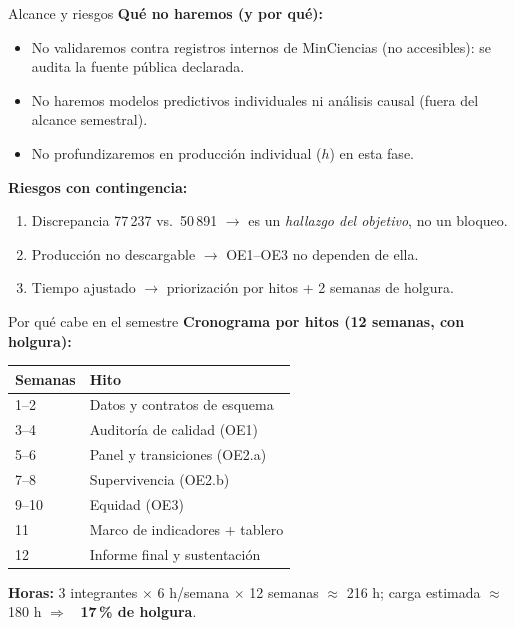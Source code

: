 \documentclass[10pt,aspectratio=169]{beamer}
\begin{document}
\begin{frame}{Alcance y riesgos}
\textbf{Qué no haremos (y por qué):}
\begin{itemize}
  \item No validaremos contra registros internos de MinCiencias (no accesibles): se audita la fuente pública declarada.
  \item No haremos modelos predictivos individuales ni análisis causal (fuera del alcance semestral).
  \item No profundizaremos en producción individual ($h$) en esta fase.
\end{itemize}
\textbf{Riesgos con contingencia:}
\begin{enumerate}
  \item Discrepancia 77\,237 vs.\ 50\,891 $\rightarrow$ es un \emph{hallazgo del objetivo}, no un bloqueo.
  \item Producción no descargable $\rightarrow$ OE1--OE3 no dependen de ella.
  \item Tiempo ajustado $\rightarrow$ priorización por hitos + 2 semanas de holgura.
\end{enumerate}
\end{frame}

\begin{frame}{Por qué cabe en el semestre}
\textbf{Cronograma por hitos (12 semanas, con holgura):}
\begin{center}
\small
\begin{tabular}{ll}
\toprule
\textbf{Semanas} & \textbf{Hito} \\
\midrule
1--2 & Datos y contratos de esquema \\
3--4 & Auditoría de calidad (OE1) \\
5--6 & Panel y transiciones (OE2.a) \\
7--8 & Supervivencia (OE2.b) \\
9--10 & Equidad (OE3) \\
11 & Marco de indicadores + tablero \\
12 & Informe final y sustentación \\
\bottomrule
\end{tabular}
\end{center}
\vspace{2mm}
\textbf{Horas:} 3 integrantes $\times$ 6 h/semana $\times$ 12 semanas $\approx$ 216 h; carga estimada $\approx$ 180 h $\Rightarrow$ \textbf{~17\,\% de holgura}.
\end{frame}
\end{document}
